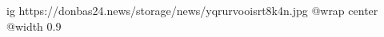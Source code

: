  
 
 
 
 

\ifcmt
  ig https://donbas24.news/storage/news/yqrurvooisrt8k4n.jpg
  @wrap center
  @width 0.9
\fi
